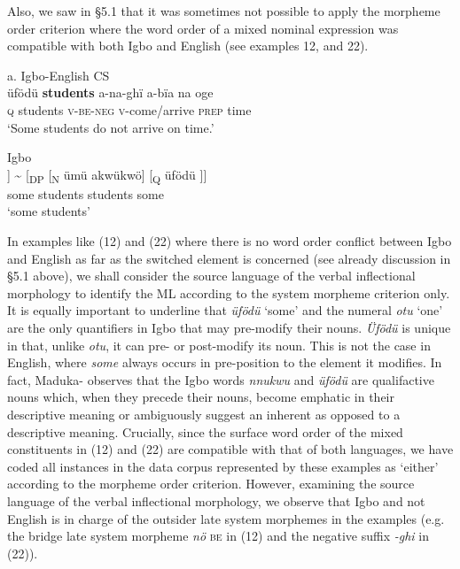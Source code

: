 \documentclass[output=paper]{langsci/langscibook}
\begin{document}
Also, we saw in §5.1 that it was sometimes not possible to apply the morpheme order criterion where the word order of a mixed nominal expression was compatible with both Igbo and English (see examples 12, and 22).

\ea
{a. Igbo-English CS}\\
\gll üfödü  \textbf{students}\textbf{  }a-na-ghï   a-bïa    na   oge\\
     \textsc{q}     students  \textsc{v-be-neg}  \textsc{v}{}-come/arrive  \textsc{prep}  time   \\
\glt ‘Some students do not arrive on time.’
\z

\ea
{Igbo }\\
\gll [\textsubscript{DP}\textsuperscript{ }[\textsubscript{Q }üfödü]  [\textsubscript{N }ümü akwükwö]] {\textasciitilde} [\textsubscript{DP }[\textsubscript{N  }ümü akwükwö]  [\textsubscript{Q }üfödü\textsubscript{ }]]\\
           some      students              students        some\\
\glt ‘some students’
\z

In examples like (12) and (22) where there is no word order conflict between Igbo and English as far as the switched element is concerned (see already discussion in §5.1 above), we shall consider the source language of the verbal inflectional morphology to identify the ML according to the system morpheme criterion only. It is equally important to underline that \textit{üfödü} ‘some’ and the numeral \textit{otu} ‘one’ are the only quantifiers in Igbo that may pre-modify their nouns. \textit{Üfödü} is unique in that, unlike \textit{otu}, it can pre- or post-modify its noun. This is not the case in English, where \textit{some} always occurs in pre-position to the element it modifies. In fact, Maduka-\citet[239]{Durunze1990} observes that the Igbo words \textit{nnukwu} and \textit{üfödü} are qualifactive nouns which, when they precede their nouns, become emphatic in their descriptive meaning or ambiguously suggest an inherent as opposed to a descriptive meaning. Crucially, since the surface word order of the mixed constituents in (12) and (22) are compatible with that of both languages, we have coded all instances in the data corpus represented by these examples as ‘either’ according to the morpheme order criterion. However, examining the source language of the verbal inflectional morphology, we observe that Igbo and not English is in charge of the outsider late system morphemes in the examples (e.g. the bridge late system morpheme \textit{nö }\textsc{be} in (12) and the negative suffix \textit{{}-ghi }in (22)). 
\end{document}
